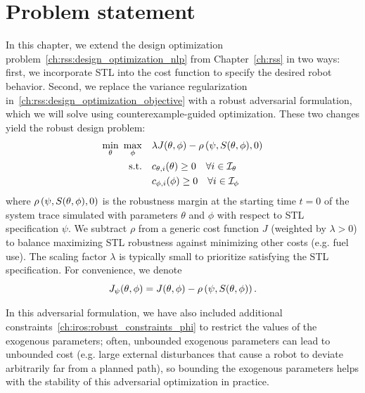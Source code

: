 \section{Problem statement}

In this chapter, we extend the design optimization problem~\eqref{ch:rss:design_optimization_nlp} from Chapter~\ref{ch:rss} in two ways: first, we incorporate STL into the cost function to specify the desired robot behavior. Second, we replace the variance regularization in~\eqref{ch:rss:design_optimization_objective} with a robust adversarial formulation, which we will solve using counterexample-guided optimization. These two changes yield the robust design problem:
%
\begin{subequations}\label{ch:iros:robust_nlp_generic}
    \begin{align}
        \min_\theta\ \max_\phi & \quad \lambda J(\theta, \phi) - \rho\left( \psi, S(\theta, \phi), 0 \right)  \label{ch:iros:robust_objective_generic}          \\
        \text{s.t.}            & \quad c_{\theta, i}(\theta) \geq 0 \quad \forall i \in \mathcal{I}_{\theta} \label{ch:iros:robust_constraints_theta} \\
                               & \quad c_{\phi, i}(\phi) \geq 0 \quad \forall i \in \mathcal{I}_{\phi} \label{ch:iros:robust_constraints_phi}
    \end{align}
\end{subequations}
%
where $\rho\left( \psi, S(\theta, \phi), 0 \right)$ is the robustness margin at the starting time $t=0$ of the system trace simulated with parameters $\theta$ and $\phi$ with respect to STL specification $\psi$. We subtract $\rho$ from a generic cost function $J$ (weighted by $\lambda > 0$) to balance maximizing STL robustness against minimizing other costs (e.g. fuel use). The scaling factor $\lambda$ is typically small to prioritize satisfying the STL specification. For convenience, we denote
\begin{equation}
    J_\psi(\theta, \phi) = J(\theta, \phi) - \rho\left( \psi, S(\theta, \phi) \right).
\end{equation}

In this adversarial formulation, we have also included additional constraints~\eqref{ch:iros:robust_constraints_phi} to restrict the values of the exogenous parameters; often, unbounded exogenous parameters can lead to unbounded cost (e.g. large external disturbances that cause a robot to deviate arbitrarily far from a planned path), so bounding the exogenous parameters helps with the stability of this adversarial optimization in practice.

